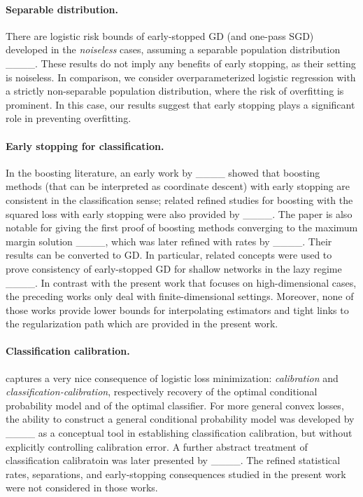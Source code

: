 \paragraph{Separable distribution.}
There are logistic risk bounds of early-stopped GD (and one-pass SGD) developed in the \emph{noiseless} cases, assuming a separable population distribution ____. 
These results do not imply any benefits of early stopping, as their setting is noiseless. 
In comparison, we consider overparameterized logistic regression with a strictly non-separable population distribution, where the risk of overfitting is prominent.
In this case, our results suggest that early stopping plays a significant role in preventing overfitting.

\paragraph{Early stopping for classification.}  
In the boosting literature, an early work by ____
showed that boosting methods (that can be interpreted as coordinate descent) with early stopping
are consistent in the classification sense;
related refined studies for boosting with the squared loss with
early stopping were also provided by ____.  
The paper is also notable for giving the first proof of boosting methods converging to the maximum margin solution ____, which was later
refined with rates by ____. 
Their results can be converted to GD.
In particular, related concepts were used to prove consistency
of early-stopped GD for shallow networks in the lazy regime ____.
In contrast with the present work that focuses on high-dimensional cases, the preceding works only deal with finite-dimensional settings.  Moreover, none of those works provide lower bounds for interpolating estimators and tight links to the regularization path which are provided in the present work.







\paragraph{Classification calibration.}  
captures a very nice consequence of logistic loss minimization:
\emph{calibration} and \emph{classification-calibration}, respectively
recovery of the optimal conditional probability model and of the
optimal classifier.  For more general convex losses, the ability
to construct a general conditional probability model was
developed by ____ as a conceptual tool in establishing
classification calibration, but without explicitly controlling
calibration error. A further abstract treatment of classification
calibratoin was later presented by ____.
The refined statistical rates, separations, and early-stopping
consequences studied in the present work were not considered in those
works.